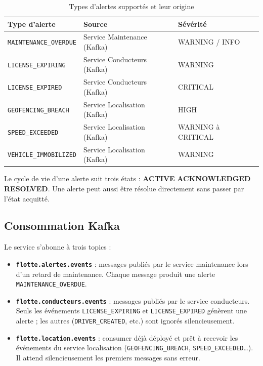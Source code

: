\documentclass[12pt,a4paper]{article}
\begin{document}
\begin{table}[H]
\centering
\small
\begin{tabular}{|l|l|l|}
  \hline
  \rowcolor{primary!15}
  \textbf{Type d'alerte} & \textbf{Source} & \textbf{S\'{e}v\'{e}rit\'{e}} \\
  \hline
  \texttt{MAINTENANCE\_OVERDUE}    & Service Maintenance (Kafka) & WARNING / INFO \\
  \texttt{LICENSE\_EXPIRING}       & Service Conducteurs (Kafka) & WARNING \\
  \texttt{LICENSE\_EXPIRED}        & Service Conducteurs (Kafka) & CRITICAL \\
  \texttt{GEOFENCING\_BREACH}      & Service Localisation (Kafka) & HIGH \\
  \texttt{SPEED\_EXCEEDED}         & Service Localisation (Kafka) & WARNING \`{a} CRITICAL \\
  \texttt{VEHICLE\_IMMOBILIZED}    & Service Localisation (Kafka) & WARNING \\
  \hline
\end{tabular}
\caption{Types d'alertes support\'{e}s et leur origine}
\end{table}

Le cycle de vie d'une alerte suit trois \'{e}tats : \textbf{ACTIVE} \textrightarrow{} \textbf{ACKNOWLEDGED} \textrightarrow{} \textbf{RESOLVED}. Une alerte peut aussi \^{e}tre r\'{e}solue directement sans passer par l'\'{e}tat acquitt\'{e}.

\subsection{Consommation Kafka}

Le service s'abonne \`{a} trois topics :

\begin{itemize}[leftmargin=*]
  \item \textbf{\texttt{flotte.alertes.events}} : messages publi\'{e}s par le service maintenance lors d'un retard de maintenance. Chaque message produit une alerte \texttt{MAINTENANCE\_OVERDUE}.

  \item \textbf{\texttt{flotte.conducteurs.events}} : messages publi\'{e}s par le service conducteurs. Seuls les \'{e}v\'{e}nements \texttt{LICENSE\_EXPIRING} et \texttt{LICENSE\_EXPIRED} g\'{e}n\`{e}rent une alerte ; les autres (\texttt{DRIVER\_CREATED}, etc.) sont ignor\'{e}s silencieusement.

  \item \textbf{\texttt{flotte.location.events}} : consumer d\'{e}j\`{a} d\'{e}ploy\'{e} et pr\^{e}t \`{a} recevoir les \'{e}v\'{e}nements du service localisation (\texttt{GEOFENCING\_BREACH}, \texttt{SPEED\_EXCEEDED}\ldots). Il attend silencieusement les premiers messages sans erreur.
\end{itemize}
\end{document}

